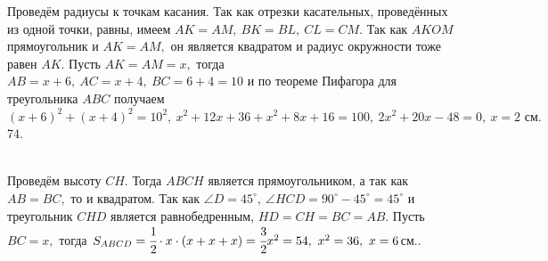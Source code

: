 \documentclass[12pt]{article}
\begin{document}
Проведём радиусы к точкам касания. Так как отрезки касательных, проведённых из одной точки, равны, имеем $AK=AM,\ BK=BL,\ CL=CM.$ Так как $AKOM$ прямоугольник и $AK=AM,$ он является квадратом и радиус окружности тоже равен $AK.$ Пусть $AK=AM=x,$ тогда $AB=x+6,\ AC=x+4,\ BC=6+4=10$ и по теореме Пифагора для треугольника $ABC$ получаем $(x+6)^2+(x+4)^2=10^2,\ x^2+12x+36+x^2+8x+16=100,\ 2x^2+20x-48=0,\ x=2\text{ см}.$\\
74. \begin{figure}[ht!]
\end{figure}\\
Проведём высоту $CH.$ Тогда $ABCH$ является прямоугольником, а так как $AB=BC,$ то и квадратом. Так как $\angle D=45^\circ,\ \angle HCD=90^\circ-45^\circ=45^\circ$ и треугольник $CHD$ является равнобедренным, $HD=CH=BC=AB.$ Пусть $BC=x,$ тогда $S_{ABCD}=\cfrac{1}{2}\cdot{x}\cdot(x+x+x)=\cfrac{3}{2}x^2=54,\ x^2=36,\ x=6$см.\newpage{}. \begin{figure}[ht!]
\end{figure}\\
\end{document}
